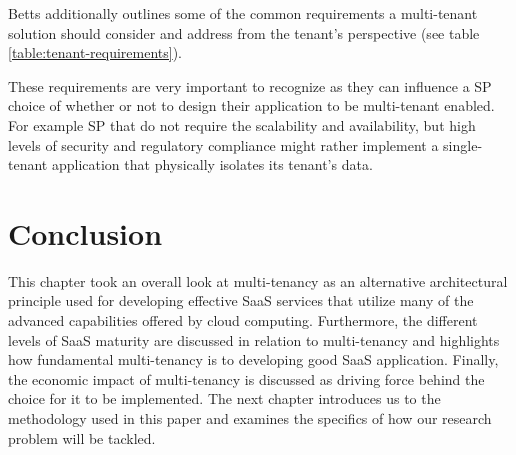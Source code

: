 Betts \cite{Betts2012-ad} additionally outlines some of the common requirements a multi-tenant solution should consider and address from the tenant's perspective (see table \ref{table:tenant-requirements}).


These requirements are very important to recognize as they can influence a SP choice of whether or not to design their application to be multi-tenant enabled. For example SP that do not require the scalability and availability, but high levels of security and regulatory compliance might rather implement a single-tenant application that physically isolates its tenant's data.


\section{Conclusion}

This chapter took an overall look at multi-tenancy as an alternative architectural principle used for developing effective SaaS services that utilize many of the advanced capabilities offered by cloud computing. Furthermore, the different levels of SaaS maturity are discussed in relation to multi-tenancy and highlights how fundamental multi-tenancy is to developing good SaaS application. Finally, the economic impact of multi-tenancy is discussed as driving force behind the choice for it to be implemented. The next chapter introduces us to the methodology used in this paper and examines the specifics of how our research problem will be tackled. 
